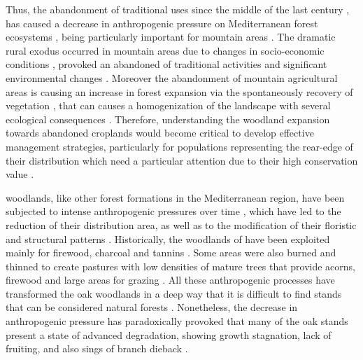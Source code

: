 Thus, the abandonment of traditional uses since the middle of the last century \autocites{MacDonaldetal2000AgriculturalAbandonment}, has caused a decrease in anthropogenic pressure on Mediterranean forest ecosystems \autocites{ValbuenaCarabanaetal2010HistoricalRecent}, being particularly important for mountain areas \autocites{Nataleetal2007StudyTree, AlvarezMartinezetal2014InfluenceLand,JimenezOlivenciaetal2015MedioSiglo,Piasetal2014ColonizationAbandoned}. The dramatic rural exodus occurred in mountain areas due to changes in socio-economic conditions \autocites{EuropeanEnvironmentAgency2010EuropeEcological}, provoked an abandoned of traditional activities and significant environmental changes \autocites{MacDonaldetal2000AgriculturalAbandonment, Nataleetal2007StudyTree, AlvarezMartinezetal2014InfluenceLand,Piussi2000ExpansionEuropean,Rutherfordetal2008AssessingLanduse,Zimmermannetal2010EffectsLanduse}. Moreover the abandonment of mountain agricultural areas is causing an increase in forest expansion via the spontaneously recovery of vegetation \autocites{Piussi2000ExpansionEuropean, AlvarezMartinezetal2014InfluenceLand}, that can causes a homogenization of the landscape \autocites{Mietkiewiczetal2017LongtermChange} with several ecological consequences \autocites{Zimmermannetal2010EffectsLanduse}. Therefore, understanding the woodland expansion towards abandoned croplands would become critical to develop effective management strategies, particularly for populations representing the rear-edge of their distribution \autocite{HampePetit2005ConservingBiodiversity} which need a particular attention due to their high conservation value \autocite{Fadyetal2016EvolutionbasedApproach}. 

\Qpw woodlands, like other forest formations in the Mediterranean region, have been subjected to intense anthropogenic pressures over time \autocites{GarciaJimenez20099230Robledales, AlbaSanchezetal2021EarlyAnthropogenic}, which have led to the reduction of their distribution area, as well as to the modification of their floristic and structural patterns \autocites{Gavilanetal2000EffectsDisturbance,Calvoetal1999PostfireSuccession,Tarregaetal2006ForestStructure}. Historically, the woodlands of \Qp have been exploited mainly for firewood, charcoal and tannins \autocites{RuizdelaTorre2006FloraMayor,SanchezPalomaresetal2008EstacionesEcologicas}. Some areas were also burned and thinned to create pastures with low densities of mature trees that provide acorns, firewood and large areas for grazing \autocites{HerreraCalvo2016UsoPastoral,Alvarezetal2009CambiosEstructura,ValbuenaCarabanaGil2017CentenaryCoppicing}. All these anthropogenic processes have transformed the oak woodlands in a deep way that it is difficult to find stands that can be considered natural forests \autocites{RuizdelaTorre2006FloraMayor}. Nonetheless, the decrease in anthropogenic pressure has paradoxically provoked that many of the \Qp oak stands present a state of advanced degradation, showing growth stagnation, lack of fruiting, and also sings of branch dieback  \autocites{Canellasetal2004GrowthResponse, Bravoetal2008SelviculturaMontes, ValbuenaCarabanaGil2014EfectosGestion, PiqueVericat2015EvolutionPerspectives, Piqueetal2018Spain}. 

